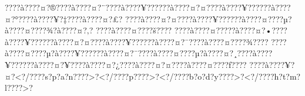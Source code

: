 \documentclass[11pt, openany]{book}
\begin{document}
???\textbar{}?à???\textbar{}?¤?®???\textbar{}?à???\textbar{}?¤?¨???\textbar{}?à???\textbar{}?¥?????\textbar{}?à???\textbar{}?¤?¤???\textbar{}?à???\textbar{}?¥?????\textbar{}?à???\textbar{}?¤?°???\textbar{}?à???\textbar{}?¥?‡???\textbar{}?à???\textbar{}?¤?£?
???\textbar{}?à???\textbar{}?¤?¤???\textbar{}?à???\textbar{}?¥?????\textbar{}?à???\textbar{}?¤???\textbar{}?µ?à???\textbar{}?¤???\textbar{}?¾?à???\textbar{}?¤?‚?
???\textbar{}?à???\textbar{}?¤???\textbar{}?š???\textbar{}?
???\textbar{}?à???\textbar{}?¤?­???\textbar{}?à???\textbar{}?¤?•???\textbar{}?à???\textbar{}?¥?????\textbar{}?à???\textbar{}?¤?¤???\textbar{}?à???\textbar{}?¥?????\textbar{}?à???\textbar{}?¤?¯???\textbar{}?à???\textbar{}?¤???\textbar{}?¾???\textbar{}?
???\textbar{}?à???\textbar{}?¤???\textbar{}?µ?à???\textbar{}?¥?????\textbar{}?à???\textbar{}?¤?¯???\textbar{}?à???\textbar{}?¤???\textbar{}?µ?à???\textbar{}?¤?¸???\textbar{}?à???\textbar{}?¥?????\textbar{}?à???\textbar{}?¤?¥???\textbar{}?à???\textbar{}?¤?¿???\textbar{}?à???\textbar{}?¤?¤???\textbar{}?à???\textbar{}?¤???\textbar{}?ƒ???\textbar{}?
???\textbar{}?à???\textbar{}?¥?¤?\textless{}?/???\textbar{}?s?p?a?n???\textbar{}?\textgreater{}?\textless{}?/???\textbar{}?p???\textbar{}?\textgreater{}?\textless{}?/???\textbar{}?b?o?d?y???\textbar{}?\textgreater{}?\textless{}?/???\textbar{}?h?t?m?l???\textbar{}?\textgreater{}?
\end{document}
